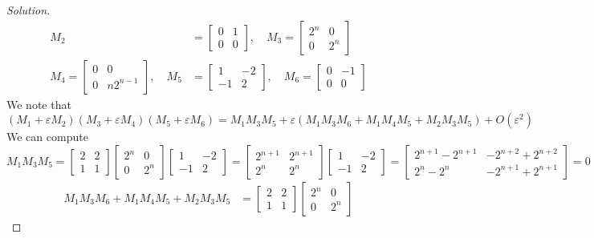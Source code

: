 \documentclass{article}
\newcommand{\ep}{{\varepsilon}}
\begin{document}
\begin{enumerate}
\begin{proof}[Solution]
\begin{align*}
			M_2 &= \begin{bmatrix} 0 & 1 \\ 0 & 0 \end{bmatrix},\quad
			M_3 = \begin{bmatrix}2^n & 0 \\ 0 & 2^n \end{bmatrix}\\
			M_4 = \begin{bmatrix} 0 & 0 \\ 0 & n2^{n-1}\end{bmatrix},\quad
			M_5 &= \begin{bmatrix} 1 & -2 \\ -1 & 2 \end{bmatrix},\quad
			M_6 = \begin{bmatrix} 0 & -1 \\ 0 & 0 \end{bmatrix}
		\end{align*}
		We note that
		\[
			(M_1 + \ep M_2)(M_3 + \ep M_4)(M_5 + \ep M_6)
			= M_1M_3M_5 + \ep(M_1M_3M_6 + M_1M_4M_5 + M_2M_3M_5) + O(\ep^2)
		\]
		We can compute
		\[
			M_1M_3M_5 = \begin{bmatrix} 2 & 2 \\ 1 & 1 \end{bmatrix}
			\begin{bmatrix}2^n & 0 \\ 0 & 2^n \end{bmatrix}
			\begin{bmatrix} 1 & -2 \\ -1 & 2 \end{bmatrix}
			= \begin{bmatrix} 2^{n+1} & 2^{n+1} \\ 2^n & 2^n \end{bmatrix}
			\begin{bmatrix} 1 & -2 \\ -1 & 2 \end{bmatrix}
			= \begin{bmatrix} 2^{n+1} - 2^{n+1} & -2^{n+2} + 2^{n+2}\\
			2^n - 2^n & -2^{n+1} + 2^{n+1} \end{bmatrix}
			= 0
		\]
		\begin{align*}
			M_1M_3M_6 + M_1M_4M_5 + M_2M_3M_5
			&= \begin{bmatrix} 2 & 2 \\ 1 & 1 \end{bmatrix}
			\begin{bmatrix}2^n & 0 \\ 0 & 2^n \end{bmatrix}

\end{align*}
\end{proof}
\end{enumerate}
\end{document}
